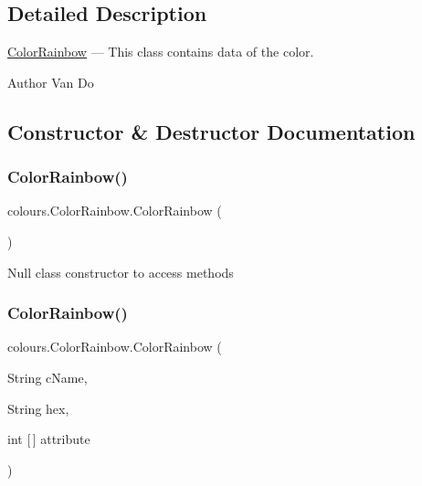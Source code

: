 \subsection{Detailed Description}
\hyperlink{classcolours_1_1_color_rainbow}{Color\+Rainbow} --- This class contains data of the color. \begin{DoxyAuthor}{Author}
Van Do 
\end{DoxyAuthor}


\subsection{Constructor \& Destructor Documentation}
\mbox{\label{classcolours_1_1_color_rainbow_a5b5afcd7b84d4ce9d9114e83952c0667}} 
\subsubsection{\texorpdfstring{Color\+Rainbow()}{ColorRainbow()}\hspace{0.1cm}{\footnotesize\ttfamily [1/2]}}
{\footnotesize\ttfamily colours.\+Color\+Rainbow.\+Color\+Rainbow (\begin{DoxyParamCaption}{ }\end{DoxyParamCaption})\hspace{0.3cm}{\ttfamily [inline]}}

Null class constructor to access methods \mbox{\label{classcolours_1_1_color_rainbow_ae530ee141556838d725f6a234d7673e2}} 
\subsubsection{\texorpdfstring{Color\+Rainbow()}{ColorRainbow()}\hspace{0.1cm}{\footnotesize\ttfamily [2/2]}}
{\footnotesize\ttfamily colours.\+Color\+Rainbow.\+Color\+Rainbow (\begin{DoxyParamCaption}\item[{String}]{c\+Name,  }\item[{String}]{hex,  }\item[{int \mbox{[}$\,$\mbox{]}}]{attribute }\end{DoxyParamCaption})\hspace{0.3cm}{\ttfamily [inline]}}

